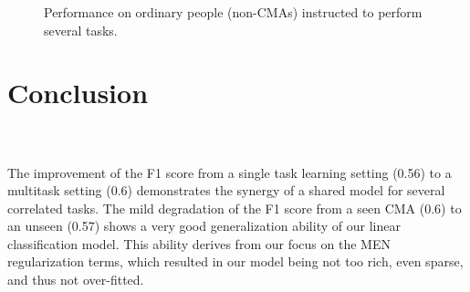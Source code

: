 \documentclass[11pt,twocolumn,varwidth=true,a4paper,fleqn]{sigchi}
\begin{document}
\begin{figure}[ht!]
\centering
{}
\caption{Performance on ordinary people (non-CMAs) instructed to
perform several tasks.}
\label{nonCMAs}
\end{figure}

\section{Conclusion}
\\\\The improvement of the F1 score from a single task learning setting (0.56) to a multitask
setting (0.6) demonstrates the synergy of a shared model for several correlated tasks.
The mild degradation of the F1 score from a seen CMA (0.6) to an unseen (0.57) shows
a very good generalization ability of our linear classification model.
This ability derives from our focus on the MEN regularization terms, which resulted in our
model being not too rich, even sparse, and thus not over-fitted.


\end{document}
